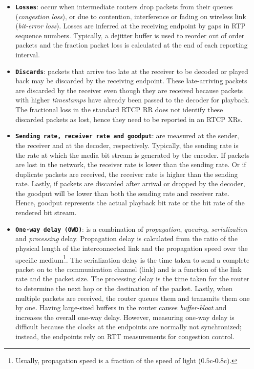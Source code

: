 \begin{itemize}
\setlength{\itemsep}{0pt}

\item \textbf{\texttt{Losses}}: occur when intermediate routers drop packets
from their queues (\emph{congestion loss}), or due to contention, interference
or fading on wireless link (\emph {bit-error loss}). Losses are inferred at
the receiving endpoint by gaps in RTP sequence numbers. Typically, a dejitter
buffer is used to reorder out of order packets and the fraction packet loss is
calculated at the end of each reporting interval.

\item \textbf{\texttt{Discards}}: packets that arrive too late at the receiver
to be decoded or played back may be discarded by the receiving endpoint. These
late-arriving packets are discarded by the receiver even though they are
received because packets with higher \textit{timestamps} have already been
passed to the decoder for playback. The fractional loss in the standard RTCP
RR does not identify these discarded packets as lost, hence they need to be
reported in an RTCP XRs.

\item \textbf{\texttt{Sending rate, receiver rate and goodput}}: are measured
at the sender, the receiver and at the decoder, respectively. Typically, the
sending rate is the rate at which the media bit stream is generated by the
encoder. If packets are lost in the network, the receiver rate is lower than
the sending rate. Or if duplicate packets are received, the receiver rate is
higher than the sending rate. Lastly, if packets are discarded after arrival
or dropped by the decoder, the goodput will be lower than both the sending
rate and receiver rate. Hence, goodput represents the actual playback bit rate
or the bit rate of the rendered bit stream.

\item \textbf{\texttt{One-way delay (OWD)}}: is a combination of
\emph{propagation}, \emph{queuing}, \emph{serialization} and \emph{processing}
delay. Propagation delay is calculated from the ratio of the physical length
of the interconnected link and the propagation speed over the specific
medium\footnote{Usually, propagation speed is a fraction of the speed of light
($0.5$c-$0.8$c).}. The serialization delay is the time taken to send a
complete packet on to the communication channel (link) and is a function of
the link rate and the packet size. The processing delay is the time taken for the
router to determine the next hop or the destination of the packet. Lastly,
when multiple packets are received, the router queues them and transmits them
one by one. Having large-sized buffers in the router causes \emph{buffer-bloat}
\cite{gettys:bufferbloat} and increases the overall one-way delay.
However, measuring one-way delay is difficult because the clocks at the
endpoints are normally not synchronized; instead, the endpoints rely on RTT
measurements for congestion control.


\end{itemize}
